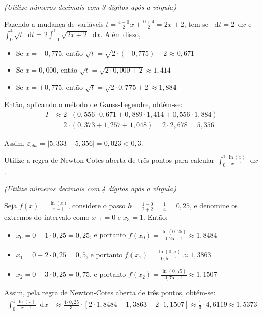 \documentclass[12pt,a4paper]{article}
\newcommand*\diff{\mathop{}\!\mathrm{d}}
\begin{document}
\begin{ExerciseList}
{\color{blue} \textit{(Utilize números decimais com 3 dígitos após a vírgula)}}

\Answer

Fazendo a mudança de variáveis $t = \frac{4 - 0}{2}x + \frac{0 + 4}{2} = 2x + 2$, tem-se $\diff{t} = 2\diff{x}$ e
$\int_{0}^{4} \sqrt{t} \diff{t} = 2\int_{-1}^1 \sqrt{2x + 2}\diff{x}$. Além disso,

\begin{itemize}
  \item Se $x = -0,775$, então $\sqrt{t} = \sqrt{2\cdot(-0,775) + 2} \approx 0,671$
  \item Se $x =  0,000$, então $\sqrt{t} = \sqrt{2\cdot  0,000  + 2} \approx 1,414$
  \item Se $x = +0,775$, então $\sqrt{t} = \sqrt{2\cdot  0,775  + 2} \approx 1,884$
\end{itemize}

Então, aplicando o método de Gauss-Legendre, obtém-se:
\begin{align*}
I & \approx
  2 \cdot (0,556 \cdot 0,671 + 0,889 \cdot 1,414 + 0,556 \cdot 1,884) \\
& = 2 \cdot (0,373 + 1,257 + 1,048)
  = 2 \cdot 2,678
  = 5,356
\end{align*}

Assim, $\varepsilon_{abs} = |5,333 - 5,356| = 0,023 < 0,3$.


\Exercise[title={2,0}] Utilize a regra de Newton-Cotes aberta de três pontos para calcular $\int_{0}^{1} \frac{\ln(x)}{x-1} \diff{x}$.

{\color{blue} \textit{(Utilize números decimais com 4 dígitos após a vírgula)}}

\Answer Seja $f(x) = \frac{\ln(x)}{x-1}$, considere o passo $h = \frac{1 - 0}{2 + 2} = \frac{1}{4} = 0,25$, e denomine os extremos do intervalo como $x_{-1} = 0$ e $x_3 = 1$. Então:
\begin{itemize}
  \item $x_0 = 0 + 1 \cdot 0,25 = 0,25$, e portanto $f(x_0) = \frac{\ln(0,25)}{0,25-1} \approx 1,8484$
  \item $x_1 = 0 + 2 \cdot 0,25 = 0,5$, e portanto $f(x_1) = \frac{\ln(0,5)}{0,5-1} \approx 1,3863$
  \item $x_2 = 0 + 3 \cdot 0,25 = 0,75$, e portanto $f(x_2) = \frac{\ln(0,75)}{0,75-1} \approx 1,1507$
\end{itemize}

Assim, pela regra de Newton-Cotes aberta de três pontos, obtém-se:
\begin{align*}
  \int_{0}^{1} \frac{\ln(x)}{x-1} \diff{x}
  & \approx \frac{4 \cdot 0,25}{3} \cdot \left[ 2\cdot 1,8484 - 1,3863 + 2\cdot 1,1507 \right]
    \approx \frac{1}{3} \cdot 4,6119
    \approx 1,5373
\end{align*}


\end{ExerciseList}
\end{document}
